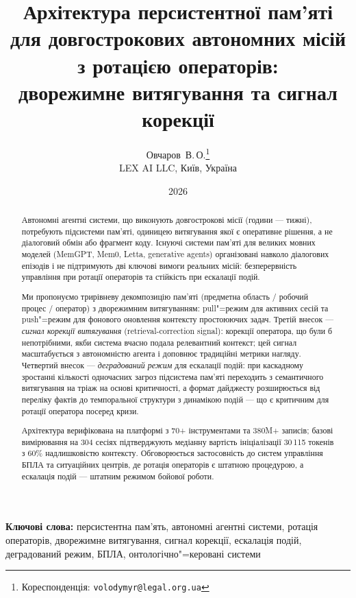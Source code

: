\documentclass[11pt]{article}
\title{%
  Архітектура персистентної пам'яті \\
  для довгострокових автономних місій \\
  з ротацією операторів: \\
  дворежимне витягування та сигнал корекції%
}
\author{
  Овчаров~В.\,О.\thanks{Кореспонденція: \texttt{volodymyr@legal.org.ua}}\\
  LEX AI LLC, Київ, Україна
}
\date{2026}
\begin{document}
\maketitle

\begin{abstract}
Автономні агентні системи, що виконують довгострокові місії (години --- тижні), потребують підсистеми пам'яті, одиницею витягування якої є оперативне рішення, а не діалоговий обмін або фрагмент коду.
Існуючі системи пам'яті для великих мовних моделей (MemGPT, Mem0, Letta, generative agents) організовані навколо діалогових епізодів і не підтримують дві ключові вимоги реальних місій: безперервність управління при ротації операторів та стійкість при ескалації подій.

Ми пропонуємо трирівневу декомпозицію пам'яті (предметна область / робочий процес / оператор) з дворежимним витягуванням: pull"=режим для активних сесій та push"=режим для фонового оновлення контексту простоюючих задач.
Третій внесок --- \emph{сигнал корекції витягування} (retrieval-correction signal): корекції оператора, що були б непотрібними, якби система вчасно подала релевантний контекст; цей сигнал масштабується з автономністю агента і доповнює традиційні метрики нагляду.
Четвертий внесок --- \emph{деградований режим} для ескалації подій: при каскадному зростанні кількості одночасних загроз підсистема пам'яті переходить з семантичного витягування на тріаж на основі критичності, а формат дайджесту розширюється від переліку фактів до темпоральної структури з динамікою подій --- що є критичним для ротації оператора посеред кризи.

Архітектура верифікована на платформі з 70+ інструментами та 380M+ записів; базові вимірювання на 304 сесіях підтверджують медіанну вартість ініціалізації 30\,115 токенів з 60\% надлишковістю контексту.
Обговорюється застосовність до систем управління БПЛА та ситуаційних центрів, де ротація операторів є штатною процедурою, а ескалація подій --- штатним режимом бойової роботи.
\end{abstract}

\medskip
\noindent\textbf{Ключові слова:} персистентна пам'ять, автономні агентні системи, ротація операторів, дворежимне витягування, сигнал корекції, ескалація подій, деградований режим, БПЛА, онтологічно"=керовані системи

\end{document}
